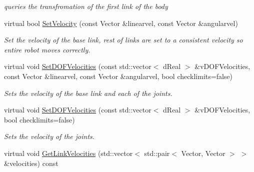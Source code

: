 \begin{DoxyCompactItemize}
\begin{DoxyCompactList}\small\item\em queries the transfromation of the first link of the body \item\end{DoxyCompactList}\item 
virtual bool \hyperlink{classOpenRAVE_1_1KinBody_ac739ab6c3a2a0d486cc0d280bb2b74db}{SetVelocity} (const Vector \&linearvel, const Vector \&angularvel)
\begin{DoxyCompactList}\small\item\em Set the velocity of the base link, rest of links are set to a consistent velocity so entire robot moves correctly. \item\end{DoxyCompactList}\item 
virtual void \hyperlink{classOpenRAVE_1_1KinBody_aff61afba85f45d8c7262c5391b271cb1}{SetDOFVelocities} (const std::vector$<$ dReal $>$ \&vDOFVelocities, const Vector \&linearvel, const Vector \&angularvel, bool checklimits=false)
\begin{DoxyCompactList}\small\item\em Sets the velocity of the base link and each of the joints. \item\end{DoxyCompactList}\item 
virtual void \hyperlink{classOpenRAVE_1_1KinBody_a0718b6336d442f3e2320f7b17d84d516}{SetDOFVelocities} (const std::vector$<$ dReal $>$ \&vDOFVelocities, bool checklimits=false)
\begin{DoxyCompactList}\small\item\em Sets the velocity of the joints. \item\end{DoxyCompactList}\item 
\hypertarget{classOpenRAVE_1_1KinBody_ab3b39cad05596c9fd0bd37de058239f4}{
virtual void \hyperlink{classOpenRAVE_1_1KinBody_ab3b39cad05596c9fd0bd37de058239f4}{GetLinkVelocities} (std::vector$<$ std::pair$<$ Vector, Vector $>$ $>$ \&velocities) const }
\label{classOpenRAVE_1_1KinBody_ab3b39cad05596c9fd0bd37de058239f4}


\end{DoxyCompactItemize}
